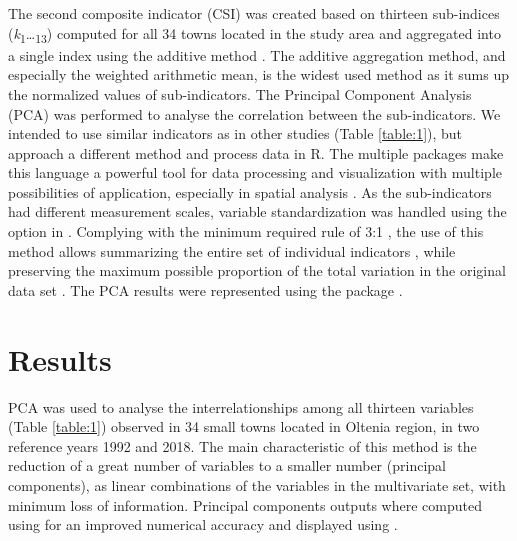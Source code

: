 The second composite indicator (CSI) was created based on thirteen sub-indices (\textit{k}\textsubscript{1}\dots\textsubscript{13}) computed for all 34 towns located in the study area and aggregated into a single index using the additive method \citep{gan_when_2017, nardo_tools_2005, oecd_handbook_2008, saisana_state_2002, syrovatka_measuring_2019}. The additive aggregation method, and especially the weighted arithmetic mean, is the widest used method \citep{gan_when_2017, pollesch_applications_2015} as it sums up the normalized values of sub-indicators.
The Principal Component Analysis (PCA) was performed to analyse the correlation between the sub-indicators. We intended to use similar indicators as in other studies (Table \ref{table:1}), but approach a different method and process data in R. The multiple packages make this language a powerful tool for data processing and visualization \citep{barry_collections_2018} with multiple possibilities of application, especially in spatial analysis \citep{lovelace_geocomputation_2019}. As the sub-indicators had different measurement scales, variable standardization was handled using the option  in . Complying with the minimum required rule of 3:1 \citep{jollands_usefulness_2003}, the use of this method allows summarizing the entire set of individual indicators \citep{paul_methodological_2013, jolliffe_principal_2016}, while preserving the maximum possible proportion of the total variation in the original data set \citep{sharma_applied_1996}. The PCA results were represented using the  package \citep{kassambara_r_2017, wickham_ggplot2_2016}.

\section{Results}

PCA was used to analyse the interrelationships among all thirteen variables (Table \ref{table:1}) observed in 34 small towns located in Oltenia region, in two reference years 1992 and 2018. The main characteristic of this method is the reduction of a great number of variables to a smaller number (principal components), as linear combinations of the variables in the multivariate set, with minimum loss of information. Principal components outputs where computed using  for an improved numerical accuracy and displayed using .

